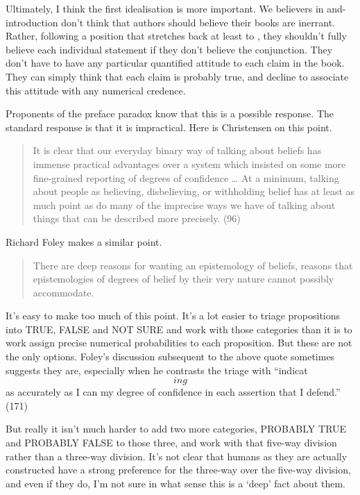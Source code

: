 \documentclass[11pt,]{book}
\begin{document}
Ultimately, I think the first idealisation is more important. We believers in and-introduction don't think that authors should believe their books are inerrant. Rather, following a position that stretches back at least to \citet{Stalnaker1984}, they shouldn't fully believe each individual statement if they don't believe the conjunction. They don't have to have any particular quantified attitude to each claim in the book. They can simply think that each claim is probably true, and decline to associate this attitude with any numerical credence.

Proponents of the preface paradox know that this is a possible response. The standard response is that it is impractical. Here is Christensen on this point.

\begin{quote}
It is clear that our everyday binary way of talking about beliefs has immense practical advantages over a system which insisted on some more fine-grained reporting of degrees of confidence \ldots{} At a minimum, talking about people as believing, disbelieving, or withholding belief has at least as much point as do many of the imprecise ways we have of talking about things that can be described more precisely. (96)
\end{quote}

Richard Foley makes a similar point.

\begin{quote}
There are deep reasons for wanting an epistemology of beliefs, reasons that epistemologies of degrees of belief by their very nature cannot possibly accommodate. \citep[ 170, my emphasis]{Foley1993}
\end{quote}

It's easy to make too much of this point. It's a lot easier to triage propositions into TRUE, FALSE and NOT SURE and work with those categories than it is to work assign precise numerical probabilities to each proposition. But these are not the only options. Foley's discussion subsequent to the above quote sometimes suggests they are, especially when he contrasts the triage with ``indicat\[ing\] as accurately as I can my degree of confidence in each assertion that I defend.'' (171)

But really it isn't much harder to add two more categories, PROBABLY TRUE and PROBABLY FALSE to those three, and work with that five-way division rather than a three-way division. It's not clear that humans as they are actually constructed have a strong preference for the three-way over the five-way division, and even if they do, I'm not sure in what sense this is a `deep' fact about them.
\end{document}
